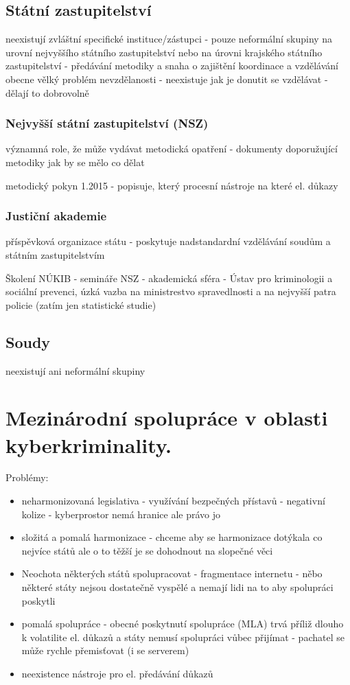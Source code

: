 \subsection{Státní zastupitelství}
neexistují zvláštní specifické instituce/zástupci - pouze neformální skupiny na urovní nejvyššího
státního zastupitelství nebo na úrovni krajského státního zastupitelství - předávání metodiky a
snaha o zajištění koordinace a vzdělávání
obecne vělký problém nevzdělanosti - neexistuje jak je donutit se vzdělávat - dělají to dobrovolně
\subsubsection{Nejvyšší státní zastupitelství (NSZ)}
významná role, že může vydávat metodická opatření - dokumenty doporužující metodiky jak by
se mělo co dělat

metodický pokyn 1.2015 - popisuje, který procesní nástroje na které el. důkazy 

\subsubsection{Justiční akademie}
příspěvková organizace státu - poskytuje nadstandardní vzdělávání soudům a státním zastupitelstvím

Školení NÚKIB - semináře NSZ - akademická sféra - Ústav pro kriminologii a sociální prevenci, úzká
vazba na ministrestvo spravedlnosti a na nejvyšší patra policie (zatím jen statistické studie)
\subsection{Soudy}
neexistují ani neformální skupiny

\newpage
\section{Mezinárodní spolupráce v oblasti kyberkriminality.}
Problémy:
\begin{itemize}
    \item neharmonizovaná legislativa - využívání bezpečných přístavů - negativní kolize - kyberprostor
nemá hranice ale právo jo
\item složitá a pomalá harmonizace - chceme aby se harmonizace dotýkala co nejvíce států ale o to
těžší je se dohodnout na slopečné věci
\item Neochota některých států spolupracovat - fragmentace internetu - něbo některé státy nejsou
dostatečně vyspělé a nemají lidi na to aby spolupráci poskytli
\item pomalá spolupráce - obecné poskytnutí spolupráce (MLA) trvá příliž dlouho k volatilite el.
důkazů a státy nemusí spolupráci vůbec přijímat - pachatel se může rychle přemisťovat (i se
serverem)
\item neexistence nástroje pro el. předávání důkazů
\end{itemize}

